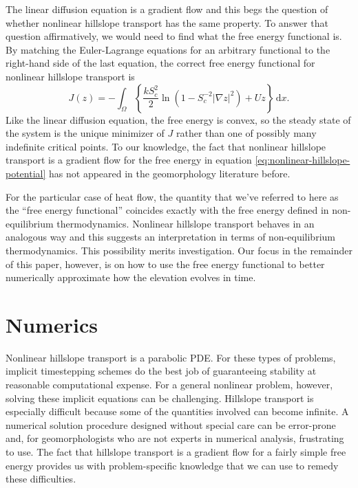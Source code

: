 \documentclass{article}
\theoremstyle{definition}
\theoremstyle{plain}
\newcommand{\ud}{\hspace{2pt}\mathrm{d}}
\begin{document}
The linear diffusion equation is a gradient flow and this begs the question of whether nonlinear hillslope transport has the same property.
To answer that question affirmatively, we would need to find what the free energy functional is.
By matching the Euler-Lagrange equations for an arbitrary functional to the right-hand side of the last equation, the correct free energy functional for nonlinear hillslope transport is
\begin{equation}
    J(z) = -\int_\Omega\left\{\frac{k S_c^2}{2}\ln\left(1 - S_c^{-2}|\nabla z|^2\right) + U z\right\}\ud x.
    \label{eq:nonlinear-hillslope-potential}
\end{equation}
Like the linear diffusion equation, the free energy is convex, so the steady state of the system is the unique minimizer of $J$ rather than one of possibly many indefinite critical points.
To our knowledge, the fact that nonlinear hillslope transport is a gradient flow for the free energy in equation \eqref{eq:nonlinear-hillslope-potential} has not appeared in the geomorphology literature before.

For the particular case of heat flow, the quantity that we've referred to here as the ``free energy functional'' coincides exactly with the free energy defined in non-equilibrium thermodynamics.
Nonlinear hillslope transport behaves in an analogous way and this suggests an interpretation in terms of non-equilibrium thermodynamics.
This possibility merits investigation.
Our focus in the remainder of this paper, however, is on how to use the free energy functional to better numerically approximate how the elevation evolves in time.


\section{Numerics}

Nonlinear hillslope transport is a parabolic PDE.
For these types of problems, implicit timestepping schemes do the best job of guaranteeing stability at reasonable computational expense.
For a general nonlinear problem, however, solving these implicit equations can be challenging.
Hillslope transport is especially difficult because some of the quantities involved can become infinite.
A numerical solution procedure designed without special care can be error-prone and, for geomorphologists who are not experts in numerical analysis, frustrating to use.
The fact that hillslope transport is a gradient flow for a fairly simple free energy provides us with problem-specific knowledge that we can use to remedy these difficulties.
\end{document}
